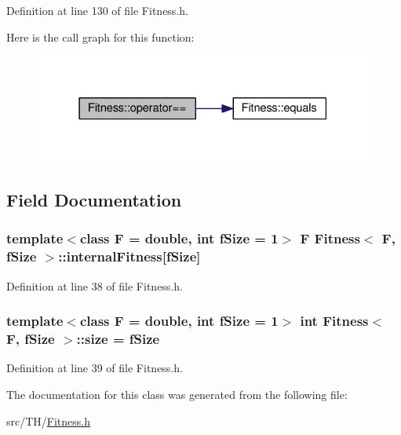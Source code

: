 Definition at line 130 of file Fitness.\+h.



Here is the call graph for this function\+:\nopagebreak
\begin{figure}[H]
\begin{center}
\leavevmode
\includegraphics[width=316pt]{structFitness_a525bb798a0016fada60e60a601c46510_cgraph}
\end{center}
\end{figure}




\subsection{Field Documentation}
\subsubsection[{\texorpdfstring{internal\+Fitness}{internalFitness}}]{\setlength{\rightskip}{0pt plus 5cm}template$<$class F = double, int f\+Size = 1$>$ F {\bf Fitness}$<$ F, f\+Size $>$\+::internal\+Fitness\mbox{[}f\+Size\mbox{]}}\hypertarget{structFitness_abffc9af3988e39e82dc81fc006e6ef4a}{}\label{structFitness_abffc9af3988e39e82dc81fc006e6ef4a}


Definition at line 38 of file Fitness.\+h.

\subsubsection[{\texorpdfstring{size}{size}}]{\setlength{\rightskip}{0pt plus 5cm}template$<$class F = double, int f\+Size = 1$>$ int {\bf Fitness}$<$ F, f\+Size $>$\+::size = f\+Size}\hypertarget{structFitness_ab487af790e21882d9308356e9b8fbf0d}{}\label{structFitness_ab487af790e21882d9308356e9b8fbf0d}


Definition at line 39 of file Fitness.\+h.



The documentation for this class was generated from the following file\+:\begin{DoxyCompactItemize}
\item 
src/\+T\+H/\hyperlink{Fitness_8h}{Fitness.\+h}\end{DoxyCompactItemize}
